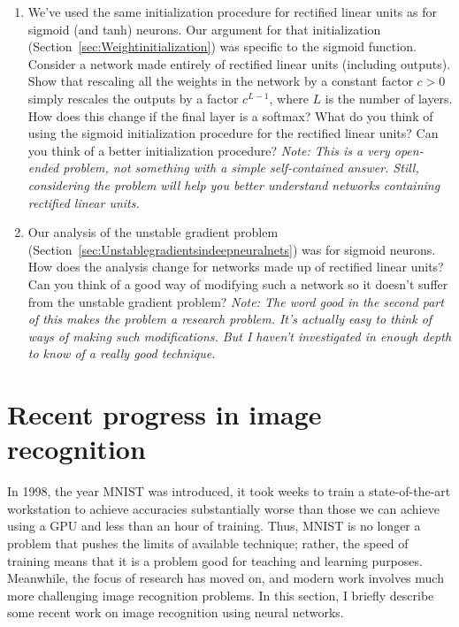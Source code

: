 \begin{enumerate}
\item 
We've used the same initialization procedure for rectified linear units as for sigmoid (and tanh) neurons. Our argument for that initialization (Section~\ref{sec:Weightinitialization}) was specific to the sigmoid function. Consider a network made entirely of rectified linear units (including outputs). Show that rescaling all the weights in the network by a constant factor $c>0$ simply rescales the outputs by a factor $c^{L-1}$, where $L$ is the number of layers. How does this change if the final layer is a softmax? What do you think of using the sigmoid initialization procedure for the rectified linear units? Can you think of a better initialization procedure? \textit{Note: This is a very open-ended problem, not something with a simple self-contained answer. Still, considering the problem will help you better understand networks containing rectified linear units.}

\item 
Our analysis of the unstable gradient problem (Section~\ref{sec:Unstablegradientsindeepneuralnets}) was for sigmoid neurons. How does the analysis change for networks made up of rectified linear units? Can you think of a good way of modifying such a network so it doesn't suffer from the unstable gradient problem?\textit{ Note: The word good in the second part of this makes the problem a research problem. It's actually easy to think of ways of making such modifications. But I haven't investigated in enough depth to know of a really good technique. }
\end{enumerate}


\section{Recent progress in image recognition}
\label{sec:Recentprogressinimagerecognition}

In 1998, the year MNIST was introduced, it took weeks to train a state-of-the-art workstation to achieve accuracies substantially worse than those we can achieve using a GPU and less than an hour of training. Thus, MNIST is no longer a problem that pushes the limits of available technique; rather, the speed of training means that it is a problem good for teaching and learning purposes. Meanwhile, the focus of research has moved on, and modern work involves much more challenging image recognition problems. In this section, I briefly describe some recent work on image recognition using neural networks.

